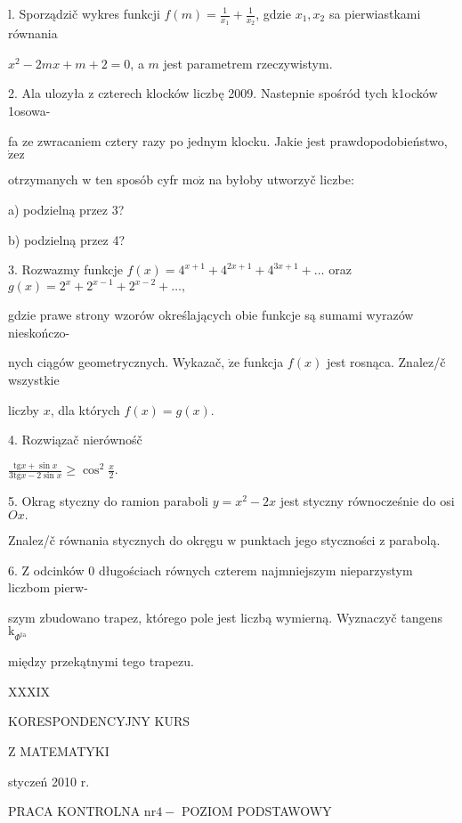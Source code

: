 \documentclass[a4paper,12pt]{article}
\begin{document}
l. Sporządzič wykres funkcji $f(m) = \displaystyle \frac{1}{x_{1}}+\frac{1}{x_{2}}$, gdzie $x_{1}, x_{2}$ sa pierwiastkami równania

$x^{2}-2mx+m+2=0$, a $m$ jest parametrem rzeczywistym.

2. Ala ulozyła $\mathrm{z}$ czterech klocków liczbę 2009. Nastepnie spośród tych k1ocków 1osowa-

fa ze zwracaniem cztery razy po jednym klocku. Jakie jest prawdopodobieństwo, $\dot{\mathrm{z}}\mathrm{e}\mathrm{z}$

otrzymanych $\mathrm{w}$ ten sposób cyfr $\mathrm{m}\mathrm{o}\dot{\mathrm{z}}$ na byłoby utworzyč liczbe:

a) podzielną przez 3?

b) podzielną przez 4?

3. Rozwazmy funkcje $ f(x)=4^{x+1}+4^{2x+1}+4^{3x+1}+\ldots$ oraz $g(x)=2^{x}+2^{x-1}+2^{x-2}+\ldots,$

gdzie prawe strony wzorów określających obie funkcje są sumami wyrazów nieskończo-

nych ciągów geometrycznych. Wykazač, $\dot{\mathrm{z}}\mathrm{e}$ funkcja $f(x)$ jest rosnąca. Znalez/č wszystkie

liczby $x$, dla których $f(x)=g(x).$

4. Rozwiązač nierównośč

$\displaystyle \frac{\mathrm{t}\mathrm{g}x+\sin x}{3\mathrm{t}\mathrm{g}x-2\sin x}\geq\cos^{2}\frac{x}{2}.$

5. Okrag styczny do ramion paraboli $y = x^{2}-2x$ jest styczny równocześnie do osi $Ox.$

Znalez/č równania stycznych do okręgu $\mathrm{w}$ punktach jego styczności $\mathrm{z}$ parabolą.

6. $\mathrm{Z}$ odcinków $0$ długościach równych czterem najmniejszym nieparzystym liczbom pierw-

szym zbudowano trapez, którego pole jest liczbą wymierną. Wyznaczyč tangens $\mathrm{k}_{\Phi^{\mathrm{t}\mathrm{a}}}$

między przekątnymi tego trapezu.





XXXIX

KORESPONDENCYJNY KURS

Z MATEMATYKI

styczeń 2010 r.

PRACA KONTROLNA $\mathrm{n}\mathrm{r} 4-$ POZIOM PODSTAWOWY
\end{document}
